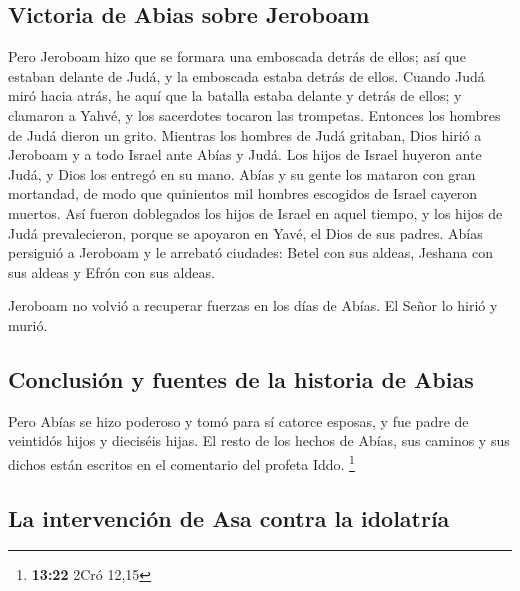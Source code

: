 \hypertarget{victoria-de-abias-sobre-jeroboam}{%
\subsection{Victoria de Abias sobre
Jeroboam}\label{victoria-de-abias-sobre-jeroboam}}

 Pero Jeroboam hizo que se formara una emboscada detrás
de ellos; así que estaban delante de Judá, y la emboscada estaba detrás
de ellos.  Cuando Judá miró hacia atrás, he aquí que la
batalla estaba delante y detrás de ellos; y clamaron a Yahvé, y los
sacerdotes tocaron las trompetas.  Entonces los hombres
de Judá dieron un grito. Mientras los hombres de Judá gritaban, Dios
hirió a Jeroboam y a todo Israel ante Abías y Judá.  Los
hijos de Israel huyeron ante Judá, y Dios los entregó en su mano.
 Abías y su gente los mataron con gran mortandad, de modo
que quinientos mil hombres escogidos de Israel cayeron muertos.
 Así fueron doblegados los hijos de Israel en aquel
tiempo, y los hijos de Judá prevalecieron, porque se apoyaron en Yavé,
el Dios de sus padres.  Abías persiguió a Jeroboam y le
arrebató ciudades: Betel con sus aldeas, Jeshana con sus aldeas y Efrón
con sus aldeas.

 Jeroboam no volvió a recuperar fuerzas en los días de
Abías. El Señor lo hirió y murió.

\hypertarget{conclusiuxf3n-y-fuentes-de-la-historia-de-abias}{%
\subsection{Conclusión y fuentes de la historia de
Abias}\label{conclusiuxf3n-y-fuentes-de-la-historia-de-abias}}

 Pero Abías se hizo poderoso y tomó para sí catorce
esposas, y fue padre de veintidós hijos y dieciséis hijas.
 El resto de los hechos de Abías, sus caminos y sus
dichos están escritos en el comentario del profeta Iddo. \footnote{\textbf{13:22}
  2Cró 12,15}

\hypertarget{la-intervenciuxf3n-de-asa-contra-la-idolatruxeda}{%
\subsection{La intervención de Asa contra la
idolatría}\label{la-intervenciuxf3n-de-asa-contra-la-idolatruxeda}}

